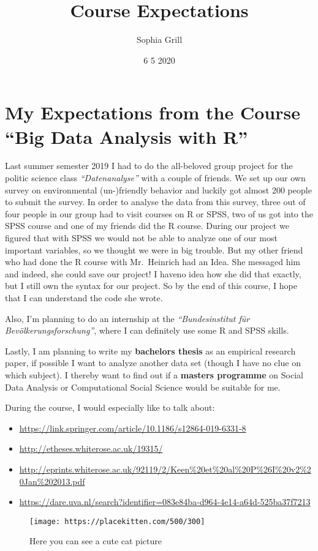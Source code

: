 \documentclass[
]{article}
\title{Course Expectations}
\author{Sophia Grill}
\date{6 5 2020}
\providecommand{\tightlist}{%
  \setlength{\itemsep}{0pt}\setlength{\parskip}{0pt}}
\begin{document}
\maketitle

\hypertarget{my-expectations-from-the-course-big-data-analysis-with-r}{%
\section{My Expectations from the Course ``Big Data Analysis with
R''}\label{my-expectations-from-the-course-big-data-analysis-with-r}}

Last summer semester 2019 I had to do the all-beloved group project for
the politic science class \emph{``Datenanalyse''} with a couple of
friends. We set up our own survey on environmental (un-)friendly
behavior and luckily got almost 200 people to submit the survey. In
order to analyse the data from this survey, three out of four people in
our group had to visit courses on R or SPSS, two of us got into the SPSS
course and one of my friends did the R course. During our project we
figured that with SPSS we would not be able to analyze one of our most
important variables, so we thought we were in big trouble. But my other
friend who had done the R course with Mr.~Heinrich had an Idea. She
messaged him and indeed, she could save our project! I haveno idea how
she did that exactly, but I still own the syntax for our project. So by
the end of this course, I hope that I can understand the code she wrote.

Also, I'm planning to do an internship at the \emph{``Bundesinstitut für
Bevölkerungsforschung''}, where I can definitely use some R and SPSS
skills.

Lastly, I am planning to write my \textbf{bachelors thesis} as an
empirical research paper, if possible I want to analyze another data set
(though I have no clue on which subject). I thereby want to find out if
a \textbf{masters programme} on Social Data Analysis or Computational
Social Science would be suitable for me.

During the course, I would especially like to talk about:

\begin{itemize}
\tightlist
\item
  \url{https://link.springer.com/article/10.1186/s12864-019-6331-8}
\item
  \url{http://etheses.whiterose.ac.uk/19315/}
\item
  \url{http://eprints.whiterose.ac.uk/92119/2/Keen\%20et\%20al\%20P\%26I\%20v2\%20Jan\%202013.pdf}
\item
  \url{https://dare.uva.nl/search?identifier=083e84ba-d964-4e14-a64d-525ba37f7213}
\end{itemize}

\begin{figure}
\centering
\texttt{[image: https://placekitten.com/500/300]}
\caption{Here you can see a cute cat picture}
\end{figure}
\end{document}
